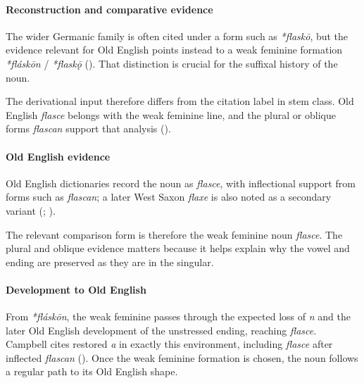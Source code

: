 \documentclass[
  british,
  a4paper,
]{article}
\begin{document}
\paragraph{Reconstruction and comparative
evidence}\label{reconstruction-and-comparative-evidence-10}

The wider Germanic family is often cited under a form such as
\emph{*flaskō}, but the evidence relevant for Old English points instead
to a weak feminine formation \emph{*fláskōn} / \emph{*flaskǭ}
(). That distinction is crucial
for the suffixal history of the noun.

The derivational input therefore differs from the citation label in stem
class. Old English \emph{flasce} belongs with the weak feminine line,
and the plural or oblique forms \emph{flascan} support that analysis
().

\paragraph{Old English evidence}\label{old-english-evidence-10}

Old English dictionaries record the noun as \emph{flasce}, with
inflectional support from forms such as \emph{flascan}; a later West
Saxon \emph{flaxe} is also noted as a secondary variant
(;
).

The relevant comparison form is therefore the weak feminine noun
\emph{flasce}. The plural and oblique evidence matters because it helps
explain why the vowel and ending are preserved as they are in the
singular.

\paragraph{Development to Old
English}\label{development-to-old-english-10}

From \emph{*fláskōn}, the weak feminine passes through the expected loss
of \emph{n} and the later Old English development of the unstressed
ending, reaching \emph{flasce}. Campbell cites restored \emph{a} in
exactly this environment, including \emph{flasce} after inflected
\emph{flascan} ().
Once the weak feminine formation is chosen, the noun follows a regular
path to its Old English shape.
\end{document}
